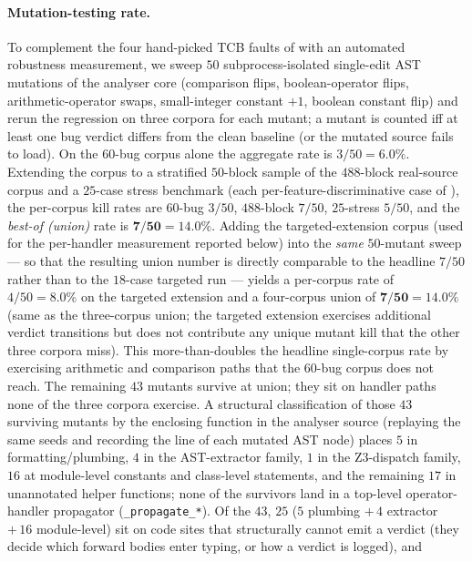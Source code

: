 \paragraph{Mutation-testing rate.}
To complement the four hand-picked TCB faults of
 with an automated robustness measurement, we
sweep $50$ subprocess-isolated single-edit AST mutations of the
analyser core (comparison flips, boolean-operator flips,
arithmetic-operator swaps, small-integer constant $+1$, boolean
constant flip) and rerun the regression on three corpora for each
mutant; a mutant is counted iff at least one bug verdict differs
from the clean baseline (or the mutated source fails to load).
On the $60$-bug corpus alone the aggregate rate is
$3/50 = 6.0\%$. Extending the corpus to a stratified
$50$-block sample of the $488$-block real-source corpus and a
$25$-case stress benchmark (each per-feature-discriminative case
of ), the per-corpus kill rates are
$60$-bug $3/50$, $488$-block $7/50$, $25$-stress $5/50$, and
the \emph{best-of (union)} rate is $\mathbf{7/50 = 14.0\%}$.
Adding the targeted-extension corpus
(used for the per-handler measurement reported below) into the
\emph{same} $50$-mutant sweep --- so that the resulting union
number is directly comparable to the headline $7/50$ rather than
to the $18$-case targeted run --- yields a per-corpus rate of
$4/50 = 8.0\%$ on the targeted extension and a four-corpus union
of $\mathbf{7/50 = 14.0\%}$ (same as the three-corpus union; the
targeted extension exercises additional verdict transitions but
does not contribute any unique mutant kill that the other three
corpora miss).
This more-than-doubles the headline single-corpus rate by
exercising arithmetic and comparison paths that the $60$-bug
corpus does not reach. The remaining $43$ mutants survive at
union; they sit on handler paths none of the three corpora
exercise. A structural classification of those $43$ surviving
mutants by the enclosing function in the analyser source
(replaying the same seeds and recording the line of each
mutated AST node) places $5$ in formatting/plumbing, $4$ in
the AST-extractor family, $1$ in the Z3-dispatch family, $16$ at
module-level constants and class-level statements, and the
remaining $17$ in unannotated helper functions; none of the
survivors land in a top-level operator-handler propagator
(\texttt{\_propagate\_*}). Of the $43$, $25$ ($5$ plumbing
$+\,4$ extractor $+\,16$ module-level) sit on code sites
that structurally cannot emit a verdict (they decide which
forward bodies enter typing, or how a verdict is logged), and
